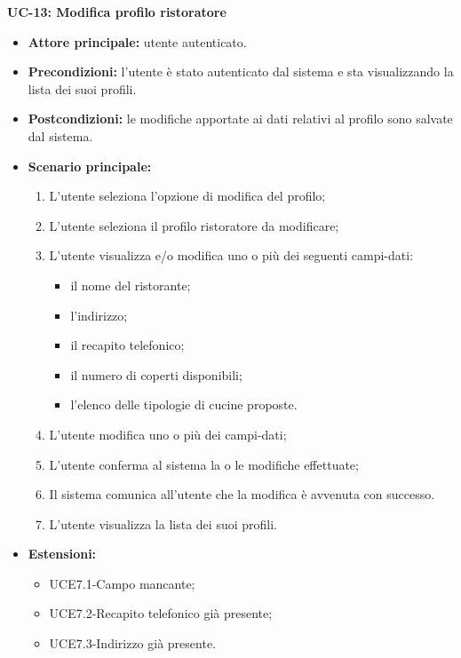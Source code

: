 \textbf{UC-13: Modifica profilo ristoratore}
\begin{itemize}
\item \textbf{Attore principale:} utente autenticato.
\item \textbf{Precondizioni:} l'utente è stato autenticato dal sistema e sta visualizzando la lista dei suoi profili.
\item \textbf{Postcondizioni:} le modifiche apportate ai dati relativi al profilo sono salvate dal sistema.
\item \textbf{Scenario principale:}
\begin{enumerate}
    \item L'utente seleziona l'opzione di modifica del profilo;
    \item L'utente seleziona il profilo ristoratore da modificare;
    \item L'utente visualizza e/o modifica uno o più dei seguenti campi-dati:
        \begin{itemize}
            \item il nome del ristorante;
            \item l'indirizzo;
            \item il recapito telefonico;
            \item il numero di coperti disponibili;
            \item l'elenco delle tipologie di cucine proposte.
        \end{itemize}
    \item L'utente modifica uno o più dei campi-dati;
    \item L'utente conferma al sistema la o le modifiche effettuate;
    \item Il sistema comunica all'utente che la modifica è avvenuta con successo.
    \item L'utente visualizza la lista dei suoi profili.
\end{enumerate}
        \item \textbf{Estensioni:}
        \begin{itemize}
                \item UCE7.1-Campo mancante;
                \item UCE7.2-Recapito telefonico già presente;
                \item UCE7.3-Indirizzo già presente.
        \end{itemize}
\end{itemize}

